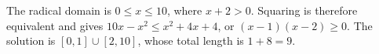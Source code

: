 The radical domain is $0\le x\le10$, where $x+2>0$. Squaring is therefore equivalent and gives $10x-x^2\le x^2+4x+4$, or $(x-1)(x-2)\ge0$. The solution is $[0,1]\cup[2,10]$, whose total length is $1+8=\boxed9$.

